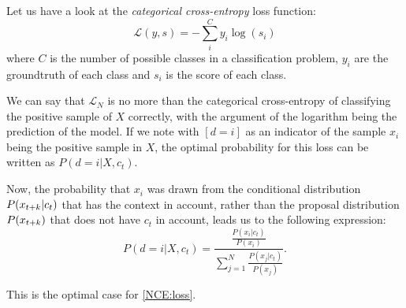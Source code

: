 Let us have a look at the \emph{categorical cross-entropy} loss function:
\[
    \mathcal L(y,s) = -\sum_i^C y_i \log(s_i)    
\]
where $C$ is the number of possible classes in a classification problem, $y_i$ are the groundtruth of each class and $s_i$ is the score of each class.

We can say that $\mathcal L_N$ is no more than the categorical cross-entropy of classifying the positive sample of $X$ correctly, with the argument of the logarithm being the prediction
of the model. If we note with $[d = i]$ as an indicator of the sample $x_i$ being the positive sample in $X$, the optimal probability for this loss can be written as $P(d = i|X,c_t)$. 

Now, the probability that $x_i$ was drawn from the conditional distribution $P(x_{t+k}|c_t)$ that has the context in account, rather than the proposal distribution $P(x_{t+k})$ that does not have $c_t$ in account, leads us to the following expression:
$$
P(d = i | X , c_t) = \frac{ \frac{P(x_i|c_t)}{P(x_i)}}{\sum_{j=1}^N \frac{P(x_j|c_t)}{P(x_j)}}.
$$

This is the optimal case for \eqref{NCE:loss}.

%
%
%


